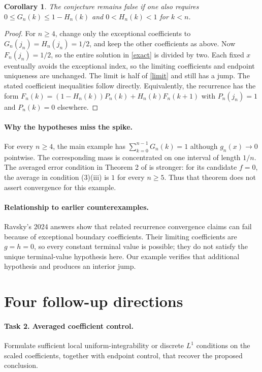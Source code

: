 \documentclass[11pt]{article}
\newtheorem{corollary}[theorem]{Corollary}
\begin{document}
\begin{corollary}
The conjecture remains false if one also requires
$0\leq G_n(k)\leq1-H_n(k)$ and $0<H_n(k)<1$ for $k<n$.
\end{corollary}
\begin{proof}
For $n\geq4$, change only the exceptional coefficients to
$G_n(j_n)=H_n(j_n)=1/2$, and keep the other coefficients as above.
Now $F_n(j_n)=1/2$, so the entire solution in \eqref{exact}
is divided by two. Each fixed $x$ eventually avoids the exceptional
index, so the limiting coefficients and endpoint uniqueness
are unchanged. The limit is half of \eqref{limit} and still
has a jump. The stated coefficient inequalities follow directly.
Equivalently, the recurrence has the form
$F_n(k)=(1-H_n(k))P_n(k)+H_n(k)F_n(k+1)$
with $P_n(j_n)=1$ and $P_n(k)=0$ elsewhere.
\end{proof}

\paragraph{Why the hypotheses miss the spike.}
For every $n\geq4$, the main example has
$\sum_{k=0}^{n-1}G_n(k)=1$ although $g_n(x)\to0$ pointwise.
The corresponding mass is concentrated on one interval of length $1/n$.
The averaged error condition in Theorem 2 of \cite{source} is stronger:
for its candidate $f=0$, the average in condition (3)(iii) is $1$
for every $n\geq5$. Thus that theorem does not assert convergence
for this example.

\paragraph{Relationship to earlier counterexamples.}
Ravsky's 2024 answers \cite{mo,mse} show that related recurrence
convergence claims can fail because of exceptional boundary
coefficients. Their limiting coefficients are $g=h=0$, so
every constant terminal value is possible; they do not satisfy
the unique terminal-value hypothesis here. Our example verifies
that additional hypothesis and produces an interior jump.

\section*{Four follow-up directions}
\paragraph{Task 2. Averaged coefficient control.}
Formulate sufficient local uniform-integrability or discrete
$L^1$ conditions on the scaled coefficients, together with endpoint
control, that recover the proposed conclusion.
\end{document}
